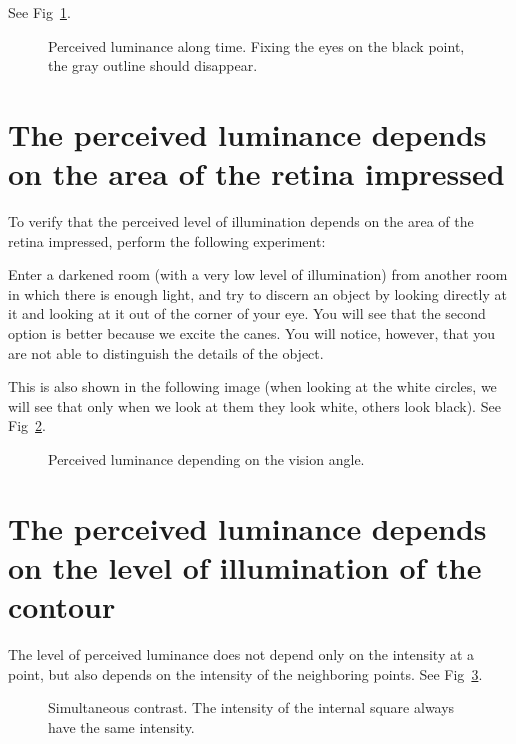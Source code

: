 See Fig~\ref{fig:perceived_luminance_along_time}.

\begin{figure}
  \caption{Perceived luminance along time. Fixing the eyes on the black point, the gray outline should disappear.} %
  \label{fig:perceived_luminance_along_time}
\end{figure}

\section{The perceived luminance depends on the area of the retina impressed}
To verify that the perceived level of illumination depends on the area
of the retina impressed, perform the following experiment:

Enter a darkened room (with a very low level of illumination) from another room in which there is enough light, and try to discern an object by looking directly at it and looking at it out of the corner of your eye. You will see that the second option is better because we excite the canes. You will notice, however, that you are not able to distinguish the details of the object.

This is also shown in the following image (when looking at the white circles, we will see that only when we look at them they look white, others look black). See Fig~\ref{fig:perceived_luminance_vs_angle}.

\begin{figure}
  \caption{Perceived luminance depending on the vision angle.} %
  \label{fig:perceived_luminance_vs_angle}
\end{figure}

\section{The perceived luminance depends on the level of illumination of the contour}

The level of perceived luminance does not depend only on the intensity at a point, but also depends on the intensity of the neighboring points. See Fig~\ref{fig:simultaneous_contrast}.

\begin{figure}
  \caption{Simultaneous contrast. The intensity of the internal square always have the same intensity.} %
  \label{fig:simultaneous_contrast}
\end{figure}


